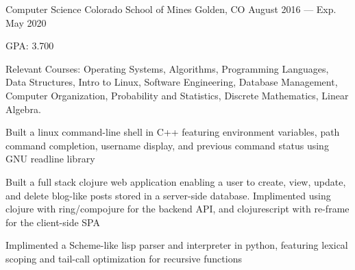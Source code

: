 

\begin{cventries}

  \cventry
    {Computer Science} %
    {Colorado School of Mines} %
    {Golden, CO} %
    {August 2016 --- Exp. May 2020} %
    {
      \begin{cvitems} %
        \item {GPA\@: 3.700}
        \item {Relevant Courses: Operating Systems, Algorithms, Programming Languages, Data Structures, Intro to Linux, Software Engineering, Database Management, Computer Organization, Probability and Statistics, Discrete Mathematics, Linear Algebra.}
        \item {Built a linux command-line shell in C++ featuring environment variables, path command completion, username display, and previous command status using GNU readline library}
        \item {Built a full stack clojure web application enabling a user to create, view, update, and delete blog-like posts stored in a server-side database. Implimented using clojure with ring/compojure for the backend API, and clojurescript with re-frame for the client-side SPA}
        \item {Implimented a Scheme-like lisp parser and interpreter in python, featuring lexical scoping and tail-call optimization for recursive functions}
      \end{cvitems}
    }

\end{cventries}
